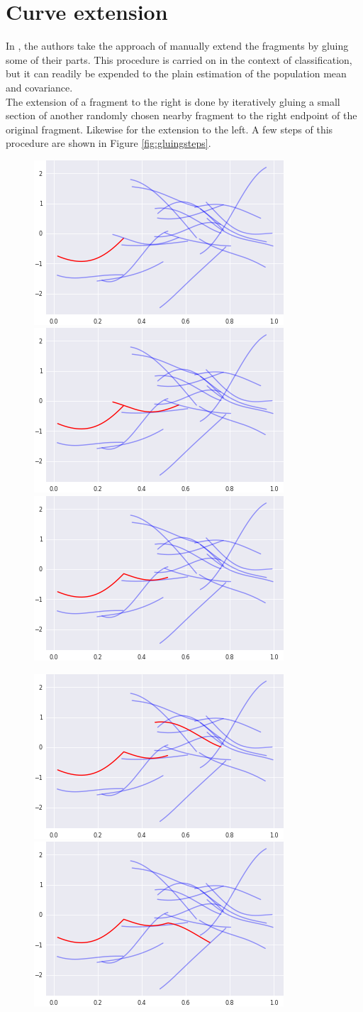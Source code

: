 \documentclass[10pt, a4paper]{report}
\theoremstyle{definition}
\theoremstyle{remark}
\begin{document}
\section{Curve extension}\label{sec:curveext}
In \cite{DH1}, the authors take the approach of manually extend the fragments by gluing some of their parts. This procedure is carried on in the context of classification, but it can readily be expended to the plain estimation of the population mean and covariance.\\
The extension of a fragment to the right is done by iteratively gluing a small section of another randomly chosen nearby fragment to the right endpoint of the original fragment. Likewise for the extension to the left. A few steps of this procedure are shown in Figure \ref{fig:gluingsteps}.
\begin{figure}[htp]
	\centering
	\includegraphics[width=.4\textwidth]{Code/images/23/step1}\quad
	\includegraphics[width=.4\textwidth]{Code/images/23/step2}\quad
	\includegraphics[width=.4\textwidth]{Code/images/23/step3}
	
	\medskip
	
	\includegraphics[width=.4\textwidth]{Code/images/23/step4}\quad
	\includegraphics[width=.4\textwidth]{Code/images/23/step5}
	

\end{figure}
\end{document}
